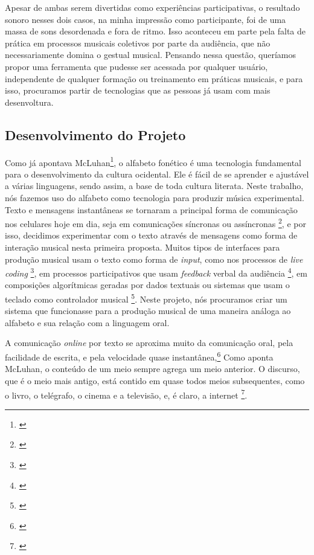 Apesar de ambas serem divertidas como experiências participativas, o resultado sonoro nesses dois casos, na minha impressão como participante, foi de uma massa de sons desordenada e fora de ritmo. Isso aconteceu em parte pela falta de prática em processos musicais coletivos por parte da audiência, que não necessariamente domina o gestual musical. Pensando nessa questão, queríamos propor uma ferramenta que pudesse ser acessada por qualquer usuário, independente de qualquer formação ou treinamento em práticas musicais, e para isso, procuramos partir de tecnologias que as pessoas já usam com mais desenvoltura.

\subsection{Desenvolvimento do Projeto}
Como já apontava McLuhan\footnote{\cite{mcluhan1968comunicaccoes}}, o alfabeto fonético é uma tecnologia fundamental para o desenvolvimento da cultura ocidental. Ele é fácil de se aprender e ajustável a várias linguagens, sendo assim, a base de toda cultura literata. Neste trabalho, nós fazemos uso do alfabeto como tecnologia para produzir música experimental. Texto e mensagens instantâneas se tornaram a principal forma de comunicação nos celulares hoje em dia, seja em comunicações síncronas ou assíncronas \footnote{\cite{Madell:2007}}, e por isso, decidimos experimentar com  o texto através de mensagens como forma de interação musical nesta primeira proposta. Muitos tipos de interfaces para produção musical usam o texto como forma de \emph{input}, como nos processos de \emph{live coding} \footnote{\cite{Collins2003}}, em processos participativos que usam \emph{feedback} verbal da audiência \footnote{\cite{noauthor_transglasphone_nodate}}, em composições algorítmicas geradas por dados textuais ou sistemas que usam o teclado como controlador musical \footnote{\cite{Fiebrink2007}}. Neste projeto, nós procuramos criar um sistema que funcionasse para a produção musical de uma maneira análoga ao alfabeto e sua relação com a linguagem oral.

A comunicação \emph{online} por texto se aproxima muito da comunicação oral, pela facilidade de escrita, e pela velocidade quase instantânea,\footnote{\cite[33]{Levinson2001}} Como aponta McLuhan, o conteúdo de um meio sempre agrega um meio anterior. O discurso, que é o meio mais antigo, está contido em quase todos meios subsequentes, como o livro, o telégrafo, o cinema e a televisão, e, é claro, a internet \footnote{\cite[42]{Levinson2001}}. 

